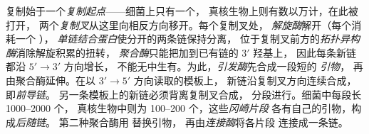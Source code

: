 \begin{definition}[复制叉及其酶]\label{def:b1:replication-mitosis:fork}
复制始于一个\emph{复制起点}——细菌上只有一个，
真核生物上则有数以万计，在此被打开，
两个\emph{复制叉}从这里向相反方向移开。每个复制叉处，
\emph{解旋酶}解开（每个消耗一个 ），
\emph{单链结合蛋白}使分开的两条链保持分离，
位于复制叉前方的\emph{拓扑异构酶}消除解旋积累的扭转，
\emph{ 聚合酶}只能把加到已有链的 $3'$ 羟基上，
因此每条新链都沿 $5' \to 3'$ 方向增长，
不能无中生有。为此，\emph{引发酶}先合成一段短的  \emph{引物}，
再由聚合酶延伸。在以 $3' \to 5'$ 方向读取的模板上，
新链沿复制叉方向连续合成，即\emph{前导链}。
另一条模板上的新链必须背离复制叉合成，
分段进行。细菌中每段长 \qtyrange{1000}{2000}{} 个，
真核生物中则为 \qtyrange{100}{200}{} 个，这些\emph{冈崎片段}
各有自己的引物，构成\emph{后随链}。
第二种聚合酶用  替换引物，
再由\emph{连接酶}将各片段
连接成一条链。
\end{definition}

